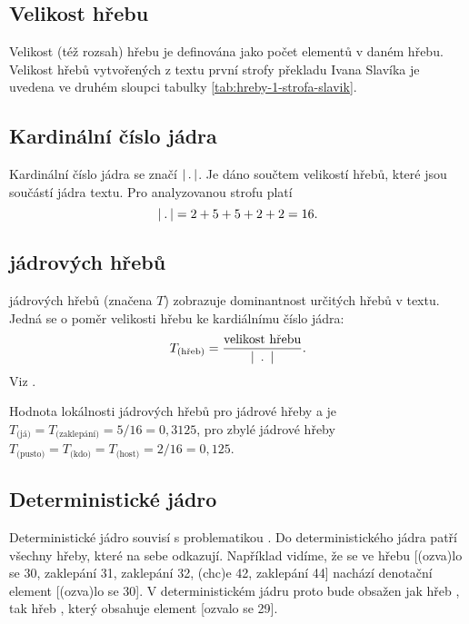 \documentclass[dp.tex]{subfiles}
\begin{document}
\subsection{Velikost hřebu}
Velikost (též rozsah) hřebu je definována jako počet elementů v daném hřebu. Velikost hřebů vytvořených z textu první strofy překladu Ivana Slavíka je uvedena ve druhém sloupci tabulky \ref{tab:hreby-1-strofa-slavik}.

\subsection{Kardinální číslo jádra}
Kardinální číslo jádra se značí $|\kern 2pt.\kern 2pt|$. Je dáno součtem velikostí hřebů, které jsou součástí jádra textu. Pro analyzovanou strofu platí
\begin{equation}
	|\kern 2pt.\kern 2pt| = 2 + 5 + 5 + 2 + 2 = 16.
\end{equation}
\subsection{ jádrových hřebů}
 jádrových hřebů (značena $T$) zobrazuje dominantnost určitých hřebů v textu.  Jedná se o poměr velikosti hřebu ke kardiálnímu číslo jádra:
\begin{equation}
T_\text{(hřeb)}=\frac{\text{velikost hřebu}}{|\kern 5pt.\kern 5pt|}.
\end{equation}
Viz \cite[str. 302]{Wimmer2003}. 

Hodnota lokálnosti jádrových hřebů pro jádrové hřeby  a  je $T_\text{(já)} = T_\text{(zaklepání)} = 5 / 16 = 0{,}3125$, pro zbylé jádrové hřeby $T_\text{(pusto)} = T_\text{(kdo)} = T_\text{(host)} = 2 / 16 = 0{,}125$.

\subsection{Deterministické jádro}

Deterministické jádro souvisí s problematikou  . Do deterministického jádra patří všechny hřeby, které na sebe odkazují. Například vidíme, že se ve hřebu  [(ozva)lo se 30, zaklepání 31, zaklepání 32, (chc)e 42, zaklepání 44] nachází denotační element [(ozva)lo se 30]. V deterministickém jádru proto bude obsažen jak hřeb , tak hřeb , který obsahuje element [ozvalo se 29].
\end{document}
